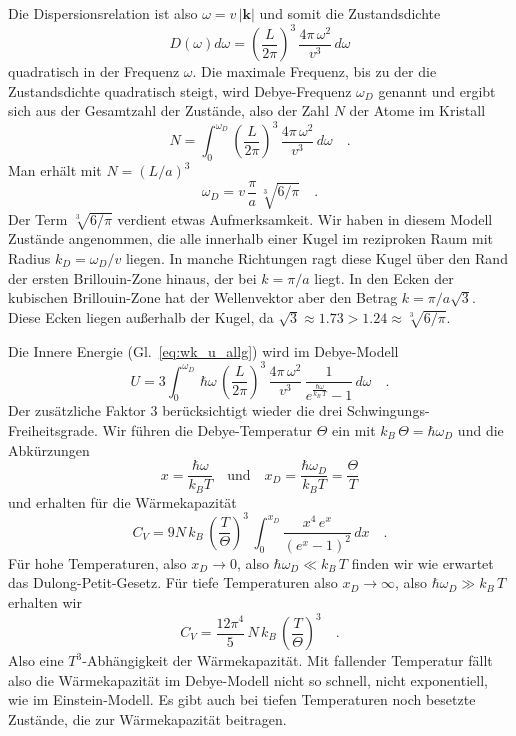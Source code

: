 Die Dispersionsrelation ist also $\omega = v \, | \mathbf{k} |$ und somit die Zustandsdichte
\begin{equation}
D(\omega) d\omega = \left( \frac{L}{2 \pi} \right)^3 \,     \frac{ 4 \pi \, \omega^2 }{v^3}   \, d\omega \label{eq:wk_debye_dos}
\end{equation} 
quadratisch in der Frequenz $\omega$. Die maximale Frequenz, bis zu der die Zustandsdichte quadratisch steigt, wird Debye-Frequenz $\omega_D$ genannt und ergibt sich aus der Gesamtzahl der Zustände, also der Zahl $N$ der Atome im Kristall
\begin{equation}
N = \int_0^{\omega_{D}}  \left( \frac{L}{2 \pi} \right)^3 \,     \frac{ 4 \pi \, \omega^2 }{v^3}   \, d\omega  \quad .
\end{equation}
Man erhält mit $N = (L / a)^3$
\begin{equation}
\omega_{D} = v \, \frac{\pi}{a} \, \sqrt[3]{6 / \pi} \quad .
\end{equation}
Der Term $\sqrt[3]{6 / \pi}$ verdient etwas Aufmerksamkeit. Wir haben in diesem Modell Zustände angenommen, die alle innerhalb einer Kugel im reziproken Raum mit Radius $k_{D} = \omega_{D} / v$ liegen. In manche Richtungen ragt diese Kugel über den Rand der ersten Brillouin-Zone hinaus, der bei $k = \pi / a$ liegt. In den  Ecken der kubischen Brillouin-Zone hat der Wellenvektor  aber den Betrag $k = \pi / a \sqrt{3}$. Diese Ecken liegen außerhalb der Kugel, da $\sqrt{3} \approx 1.73 > 1.24 \approx \sqrt[3]{6 / \pi}$.


Die Innere Energie (Gl.~\ref{eq:wk_u_allg}) wird im Debye-Modell
\begin{equation}
U = 3 \int_0^{\omega_D} \, \hbar \omega \,  \left( \frac{L}{2 \pi} \right)^3 \,     \frac{ 4 \pi \, \omega^2 }{v^3}  \,
\frac{1}{e^{\frac{\hbar \omega}{k_B \, T} }- 1} \, d\omega \quad .
\end{equation}
Der zusätzliche Faktor 3 berücksichtigt wieder die drei Schwingungs-Freiheitsgrade. Wir führen die Debye-Temperatur $\Theta$ ein mit $k_B \, \Theta = \hbar \omega_D$ und die Abkürzungen
\begin{equation}
x = \frac{\hbar \omega}{k_B T} \quad \text{und} \quad
x_D = \frac{\hbar \omega_D}{k_B T}  = \frac{\Theta}{T}
\end{equation}
und erhalten für die Wärmekapazität
\begin{equation}
C_V = 9 N \, k_B \, \left(\frac{T}{\Theta} \right)^3 \,
\int_0^{x_D} \frac{x^4 \, e^x}{\left(  e^x - 1 \right)^2} \, dx \quad .
\end{equation}
Für hohe Temperaturen, also $x_D \rightarrow 0$, also $\hbar  \omega_D \ll k_B \, T$ finden wir wie erwartet das Dulong-Petit-Gesetz. Für tiefe Temperaturen also $x_D \rightarrow \infty$, also $\hbar  \omega_D \gg k_B \, T$  erhalten wir
\begin{equation}
C_V = \frac{12 \pi^4}{5} \, N \, k_B \, \left(\frac{T}{\Theta} \right)^3 \quad .
\end{equation}
Also eine $T^3$-Abhängigkeit der Wärmekapazität. Mit fallender Temperatur fällt also die Wärmekapazität im Debye-Modell nicht so schnell, nicht exponentiell, wie im Einstein-Modell. Es gibt auch bei tiefen Temperaturen noch besetzte Zustände, die zur Wärmekapazität beitragen.

